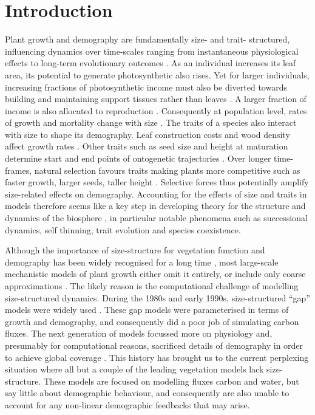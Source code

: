 \documentclass[a4paper,11pt]{article}
\begin{document}
\section{Introduction}\label{introduction}

Plant growth and demography are fundamentally size- and trait- structured,
influencing dynamics over time-scales ranging from instantaneous physiological
effects to long-term evolutionary outcomes \citep{Harper-1977, Westoby-2002}. As
an individual increases its leaf area, its potential to generate
photosynthetic also rises. Yet for larger individuals,  increasing
fractions of photosynthetic income must also be diverted towards
building and maintaining support tissues rather than leaves
\citep{Givnish-1988, Enquist-2007}. A larger fraction of income is also
allocated to reproduction \citep{Thomas-2011}. Consequently at
population level, rates of growth and mortality change with size
\citep{Muller-2006, Thomas-2011, Ruger-2011, Wright-2010}. The traits of
a species also interact with size to shape its demography. Leaf
construction costs and wood density affect growth rates
\citep{Wright-2010}. Other traits such as seed size and height at
maturation determine start and end points of ontogenetic trajectories
\citep{Westoby-2002}. Over longer time-frames, natural selection favours
traits making plants more competitive such as faster growth, larger
seeds, taller height \citep{Falster-2003}. Selective forces thus
potentially amplify size-related effects on demography. Accounting for
the effects of size and traits in models therefore seems like a key step
in developing theory for the structure and dynamics of the biosphere
\citep{Purves-2008, Moorcroft-2001, Falster-2003}, in particular notable
phenomena such as successional dynamics, self thinning, trait evolution
and species coexistence.

Although the importance of size-structure for vegetation function and
demography has been widely recognised for a long time
\citep{Harper-1977, Hara-1984, Shugart-1980, Huston-1987, Moorcroft-2001,
Kohyama-1993, Enquist-2007, Pacala-1996, Coomes-2007},
most large-scale mechanistic models of plant growth either omit it
entirely, or include only coarse approximations
\citep{Cramer-2001, Dekauwe-2014, Kelley-2013, Sitch-2003}. The likely
reason is the computational
challenge of modelling size-structured dynamics. During the 1980s and
early 1990s, size-structured ``gap'' models were widely used
\citep[e.g.][]{Huston-1987, Shugart-1980}. These gap models were
parameterised in terms of growth and demography, and consequently did a
poor job of simulating carbon fluxes. The next generation of models
focussed more on physiology and, presumably for computational reasons,
sacrificed details of demography in order to achieve global coverage
\citep{Haxeltine-1996}. This history has brought us to the
current perplexing situation where all but a couple
\citep{Moorcroft-2001, Smith-2014} of the leading vegetation
models lack size-structure. These models
are focused on modelling fluxes carbon and water, but say little about
demographic behaviour, and consequently are also unable to account for
any non-linear demographic feedbacks that may arise.
\end{document}
